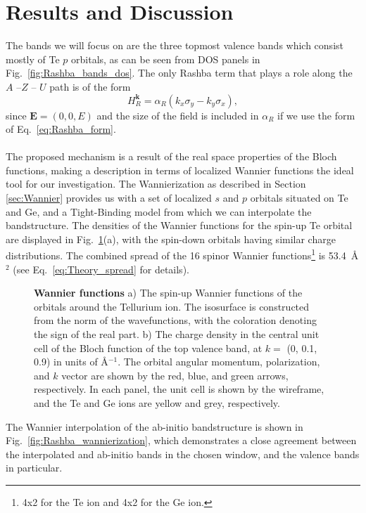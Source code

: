 \section{Results and Discussion}

The bands we will focus on are the three topmost valence bands which consist mostly of Te $p$ orbitals, as can be seen from DOS panels in Fig.~\ref{fig:Rashba_bands_dos}.
The only Rashba term that plays a role along the $A$ --$Z$ -- $U$ path is of the form
\begin{equation}
	H_R^{\bm k} = \alpha_R (k_x \sigma_y - k_y \sigma_x),
\end{equation}
since $\bm E = (0, 0, E)$ and the size of the field is included in $\alpha_R$ if we use the form of Eq.~\eqref{eq:Rashba_form}.
\\\\
The proposed mechanism is a result of the real space properties of the Bloch functions, making a description in terms of localized Wannier functions the ideal tool for our investigation.
The Wannierization as described in Section \ref{sec:Wannier} provides us with a set of localized $s$ and $p$ orbitals situated on Te and Ge, and a Tight-Binding model from which we can interpolate the bandstructure.
The densities of the Wannier functions for the spin-up Te orbital are displayed in Fig.~\ref{fig:Rashba_wannierfunctions}(a), with the spin-down orbitals having similar charge distributions.
The combined spread of the 16 spinor Wannier functions\footnote{4x2 for the Te ion and 4x2 for the Ge ion.} is 53.4~\AA$^2$ (see Eq.~\eqref{eq:Theory_spread} for details).
\begin{figure}[h]
\caption{\label{fig:Rashba_wannierfunctions}{\bf Wannier functions} a) The spin-up Wannier functions of the orbitals around the Tellurium ion. The isosurface is constructed from the norm of the wavefunctions, with the coloration denoting the sign of the real part. b) The charge density in the central unit cell of the Bloch function of the top valence band, at $k=$ (0, 0.1, 0.9) in units of \AA$^{-1}$. The orbital angular momentum, polarization, and $k$ vector are shown by the red, blue, and green arrows, respectively. In each panel, the unit cell is shown by the wireframe, and the Te and Ge ions are yellow and grey, respectively.}
\end{figure}
The Wannier interpolation of the ab-initio bandstructure is shown in Fig.~\ref{fig:Rashba_wannierization}, which demonstrates a close agreement between the interpolated and ab-initio bands in the chosen window, and the valence bands in particular. 
